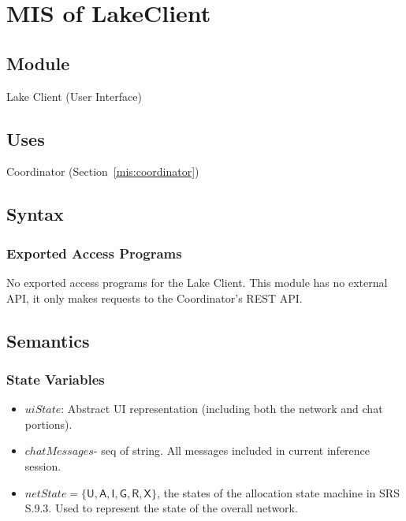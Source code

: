 \documentclass[12pt, titlepage]{article}
\begin{document}
\newpage

\section{MIS of LakeClient} \label{mis:lc}

\subsection{Module}

Lake Client (User Interface)

\subsection{Uses}

Coordinator (Section~\ref{mis:coordinator})

\subsection{Syntax}

\subsubsection{Exported Access Programs}

No exported access programs for the Lake Client. This module has no external API, it only makes
requests to the Coordinator's REST API.

\subsection{Semantics}

\subsubsection{State Variables}

\begin{itemize}
  \item $\mathit{uiState}$: Abstract UI representation (including both the network and chat portions).
  \item $\mathit{chatMessages}$- seq of string. All messages included in current inference session.
  \item $\mathit{netState} =\{\mathsf{U}, \mathsf{A}, \mathsf{I}, \mathsf{G},
    \mathsf{R}, \mathsf{X}\}$, the states of the allocation state machine in SRS
    S.9.3. Used to represent the state of the overall network.
\end{itemize}
\end{document}
